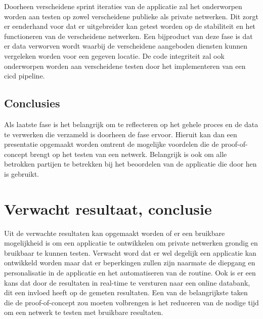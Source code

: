 Doorheen verscheidene sprint iteraties van de applicatie zal het onderworpen worden aan testen op zowel verscheidene publieke als private netwerken. Dit zorgt er eenderhand voor dat er uitgebreider kan getest worden op de stabiliteit en het functioneren van de verscheidene netwerken. Een bijproduct van deze fase is dat er data verworven wordt waarbij de verscheidene aangeboden diensten kunnen vergeleken worden voor een gegeven locatie. De code integriteit zal ook onderworpen worden aan verscheidene testen door het implementeren van een cicd pipeline.

\subsection{Conclusies}
\label{subsub:conclusies}

Als laatste fase is het belangrijk om te reflecteren op het gehele proces en de data te verwerken die verzameld is doorheen de fase ervoor. Hieruit kan dan een presentatie opgemaakt worden omtrent de mogelijke voordelen die de proof-of-concept brengt op het testen van een netwerk. Belangrijk is ook om alle betrokken partijen te betrekken bij het beoordelen van de applicatie die door hen is gebruikt. 



\section{Verwacht resultaat, conclusie}%
\label{sec:verwachte_resultaten}

Uit de verwachte resultaten kan opgemaakt worden of er een bruikbare mogelijkheid is om een applicatie te ontwikkelen om private netwerken grondig en bruikbaar te kunnen testen. Verwacht word dat er wel degelijk een applicatie kan ontwikkeld worden maar dat er beperkingen zullen zijn naarmate de diepgang en personalisatie in de applicatie en het automatiseren van de routine. Ook is er een kans dat door de resultaten in real-time te versturen naar een online databank, dit een invloed heeft op de gemeten resultaten. Een van de belangrijkste taken die de proof-of-concept zou moeten volbrengen is het reduceren van de nodige tijd om een netwerk te testen met bruikbare resultaten. 
